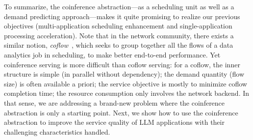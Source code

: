 To summarize, the coinference abstraction---as a scheduling unit as well as a demand predicting approach---makes it quite promising to realize our previous objectives (multi-application scheduling enhancement and single-application processing acceleration).
Note that in the network community, there exists a similar notion, \emph{coflow}~\cite{chowdhury2012coflow,chowdhury2014efficient}, which seeks to group together all the flows of a data analytics job in scheduling, to make better end-to-end performance.
Yet coinference serving is more difficult than coflow serving: for a coflow, the inner structure is simple (in parallel without dependency); the demand quantity (flow size) is often available a priori; the service objective is mostly to minimize coflow completion time; the resource consumption only involves the network backend.
In that sense, we are addressing a brand-new problem where the coinference abstraction is only a starting point.
Next, we show how to use the coinference abstraction to improve the service quality of LLM applications with their challenging characteristics handled.


